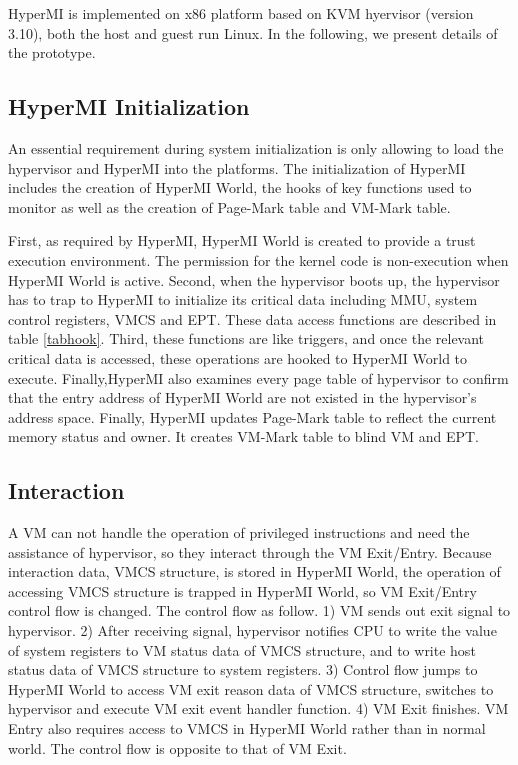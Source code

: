 \documentclass[conference]{IEEEtran}
\begin{document}
HyperMI is implemented on x86 platform based on KVM hyervisor (version 3.10), both the host and guest run Linux. In the following, we present details of the prototype. 

\subsection {HyperMI Initialization}
An essential requirement during system initialization is only allowing to load the hypervisor and HyperMI into the platforms.
The initialization of HyperMI includes the creation of HyperMI World, the hooks of key functions used to monitor as well as the creation of Page-Mark table and VM-Mark table. 

First, as required by HyperMI, HyperMI World is created to provide a trust execution environment. The permission for the kernel code is non-execution when HyperMI World is active. 
Second, when the hypervisor boots up, the hypervisor has to trap to HyperMI to initialize its critical data including MMU, system control registers, VMCS and EPT. These data access functions are described in table \ref{tabhook}.
Third, these functions are like triggers, and once the relevant critical data is accessed, these operations are hooked to HyperMI World to execute. 
Finally,HyperMI also examines every page table of hypervisor to confirm that the entry address of HyperMI World are not existed in the hypervisor's address space. 
Finally, HyperMI updates Page-Mark table to reflect the current memory status and owner. It creates VM-Mark table to blind VM and EPT.


\subsection {Interaction}

A VM can not handle the operation of privileged instructions and need the assistance of hypervisor, so they interact through the VM Exit/Entry. Because interaction data, VMCS structure, is stored in HyperMI World, the operation of accessing VMCS structure is trapped in HyperMI World, so VM Exit/Entry control flow is changed. The control flow as follow. 1) VM sends out exit signal to hypervisor. 2) After receiving signal, hypervisor notifies CPU to write the value of system registers to VM status data of VMCS structure, and to write host status data of VMCS structure to system registers. 3) Control flow jumps to HyperMI World to access VM exit reason data of VMCS structure, switches to hypervisor and execute VM exit event handler function. 4) VM Exit finishes.
VM Entry also requires access to VMCS in HyperMI World rather than in normal world. The control flow is opposite to that of VM Exit.
\end{document}
